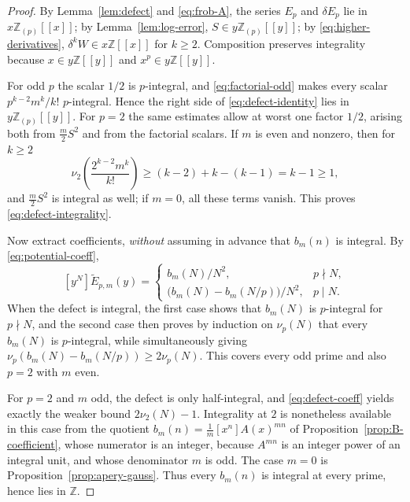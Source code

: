 \documentclass[11pt,letterpaper]{article}
\numberwithin{equation}{section}
\theoremstyle{definition}
\newcommand{\Z}{\mathbb Z}
\newcommand{\Zp}{\Z_{(p)}}
\newcommand{\dd}{\delta}
\begin{document}
\begin{proof}
By Lemma~\ref{lem:defect} and \eqref{eq:frob-A}, the series $E_p$ and
$\dd E_p$ lie in $x\Zp[[x]]$; by Lemma~\ref{lem:log-error}, $S\in
y\Zp[[y]]$; by \eqref{eq:higher-derivatives}, $\dd^kW\in x\Z[[x]]$ for
$k\geq2$. Composition preserves integrality because $x\in y\Z[[y]]$ and
$x^p\in y\Z[[y]]$.

For odd $p$ the scalar $1/2$ is $p$-integral, and
\eqref{eq:factorial-odd} makes every scalar $p^{k-2}m^k/k!$ $p$-integral.
Hence the right side of \eqref{eq:defect-identity} lies in $y\Zp[[y]]$.
For $p=2$ the same estimates allow at worst one factor $1/2$, arising
both from $\frac m2S^2$ and from the factorial scalars. If $m$ is even
and nonzero, then for $k\geq2$
\[
\nu_2\left(\frac{2^{k-2}m^k}{k!}\right)
\geq(k-2)+k-(k-1)=k-1\geq1,
\]
and $\frac m2S^2$ is integral as well; if $m=0$, all these terms vanish.
This proves \eqref{eq:defect-integrality}.

Now extract coefficients, \emph{without} assuming in advance that
$b_m(n)$ is integral. By \eqref{eq:potential-coeff},
\begin{equation}\label{eq:defect-coeff}
[y^N]\widetilde E_{p,m}(y)=
\begin{cases}
b_m(N)/N^2,&p\nmid N,\\
\bigl(b_m(N)-b_m(N/p)\bigr)/N^2,&p\mid N.
\end{cases}
\end{equation}
When the defect is integral, the first case shows that $b_m(N)$ is
$p$-integral for $p\nmid N$, and the second case then proves by induction
on $\nu_p(N)$ that every $b_m(N)$ is $p$-integral, while simultaneously
giving $\nu_p(b_m(N)-b_m(N/p))\geq2\nu_p(N)$. This covers every odd prime
and also $p=2$ with $m$ even.

For $p=2$ and $m$ odd, the defect is only half-integral, and
\eqref{eq:defect-coeff} yields exactly the weaker bound
$2\nu_2(N)-1$. Integrality at $2$ is nonetheless available in this case
from the quotient $b_m(n)=\frac1m[x^n]A(x)^{mn}$ of
Proposition~\ref{prop:B-coefficient}, whose numerator is an integer,
because $A^{mn}$ is an integer power of an integral unit, and whose
denominator $m$ is odd. The case $m=0$ is
Proposition~\ref{prop:apery-gauss}. Thus every $b_m(n)$ is integral at
every prime, hence lies in $\Z$.
\end{proof}
\end{document}
